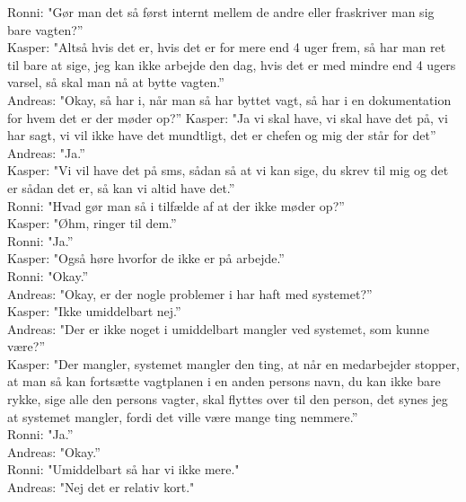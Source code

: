Ronni: "Gør man det så først internt mellem de andre eller fraskriver man sig bare vagten?”\\
Kasper: "Altså hvis det er, hvis det er for mere end 4 uger frem, så har man ret til bare at sige, jeg kan ikke arbejde den dag, hvis det er med mindre end 4 ugers varsel, så skal man nå at bytte vagten.”\\
Andreas: "Okay, så har i, når man så har byttet vagt, så har i en dokumentation for hvem det er der møder op?”
Kasper: "Ja vi skal have, vi skal have det på, vi har sagt, vi vil ikke have det mundtligt, det er chefen og mig der står for det”\\
Andreas: "Ja.”\\
Kasper: "Vi vil have det på sms, sådan så at vi kan sige, du skrev til mig og det er sådan det er, så kan vi altid have det.”\\
Ronni: "Hvad gør man så i tilfælde af at der ikke møder op?”\\
Kasper: "Øhm, ringer til dem.”\\
Ronni: "Ja.”\\
Kasper: "Også høre hvorfor de ikke er på arbejde.”\\
Ronni: "Okay.”\\
Andreas: "Okay, er der nogle problemer i har haft med systemet?”\\
Kasper: "Ikke umiddelbart nej.”\\
Andreas: "Der er ikke noget i umiddelbart mangler ved systemet, som kunne være?”\\
Kasper: "Der mangler, systemet mangler den ting, at når en medarbejder stopper, at man så kan fortsætte vagtplanen i en anden persons navn, du kan ikke bare rykke, sige alle den persons vagter, skal flyttes over til den person, det synes jeg at systemet mangler, fordi det ville være mange ting nemmere.”\\
Ronni: "Ja.”\\
Andreas: "Okay.”\\
Ronni: "Umiddelbart så har vi ikke mere."\\
Andreas: "Nej det er relativ kort."\\


